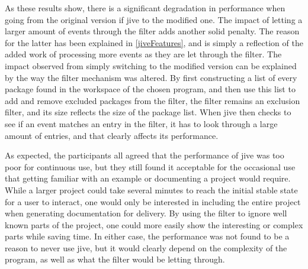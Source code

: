 As these results show, there is a significant degradation in performance when going from the original version if \gls{jive} to the modified one.
The impact of letting a larger amount of events through the filter adds another solid penalty.
The reason for the latter has been explained in \cref{jiveFeatures}, and is simply a reflection of the added work of processing more events as they are let through the filter.
The impact observed from simply switching to the modified version can be explained by the way the filter mechanism was altered.
By first constructing a list of every package found in the workspace of the chosen program, and then use this list to add and remove excluded packages from the filter, the filter remains an exclusion filter, and its size reflects the size of the package list.
When \gls{jive} then checks to see if an event matches an entry in the filter, it has to look through a large amount of entries, and that clearly affects its performance.

As expected, the participants all agreed that the performance of \gls{jive} was too poor for continuous use, but they still found it acceptable for the occasional use that getting familiar with an example or documenting a project would require.
While a larger project could take several minutes to reach the initial stable state for a user to interact, one would only be interested in including the entire project when generating documentation for delivery.
By using the filter to ignore well known parts of the project, one could more easily show the interesting or complex parts while saving time.
In either case, the performance was not found to be a reason to never use \gls{jive}, but it would clearly depend on the complexity of the program, as well as what the filter would be letting through.

